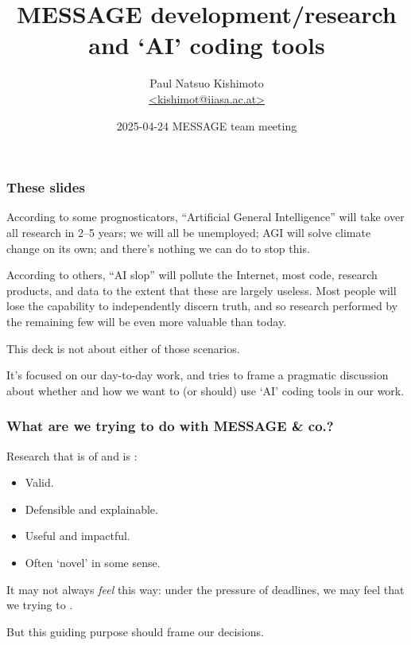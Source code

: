 \documentclass[12pt,aspectratio=169]{beamer}
\title{MESSAGE development/research and ‘AI’ coding tools}
\date{
  \texorpdfstring{2025-04-24 MESSAGE team meeting}%
  {2025-04-24}}
\author{\texorpdfstring{Paul Natsuo Kishimoto\\
  \href{mailto:kishimot@iiasa.ac.at}{\ttfamily \scriptsize <kishimot@iiasa.ac.at>}%
  }{Paul Natsuo Kishimoto <kishimot@iiasa.ac.at>}}
\begin{document}
\maketitle

\begin{frame}
\frametitle{These slides}

\bigskip
According to some prognosticators, “Artificial General Intelligence” will take over all research in 2–5 years;
we will all be unemployed;
AGI will solve climate change on its own;
and there's nothing we can do to stop this.

\smallskip
According to others, “AI slop” will pollute the Internet,
most code,
research products,
and data to the extent that these are largely useless.
Most people will lose the capability to independently discern truth,
and so research performed by the remaining few will be even more valuable than today.

\bigskip
This deck is not about either of those scenarios.

\medskip
It's focused on our day-to-day work, and tries to frame a pragmatic discussion about whether and how we want to (or should) use ‘AI’ coding tools in our work.

\end{frame}

\begin{frame}
\frametitle{What are we trying to do with MESSAGE \& co.?}

Research that is of  and is :
\begin{itemize}
  \item Valid.
  \item Defensible and explainable.
  \item Useful and impactful.
  \item Often ‘novel' in some sense.
\end{itemize}

\bigskip
It may not always \emph{feel} this way:
under the pressure of deadlines,
we may feel that we trying to
.

But this guiding purpose should frame our decisions.

\end{frame}
\end{document}
